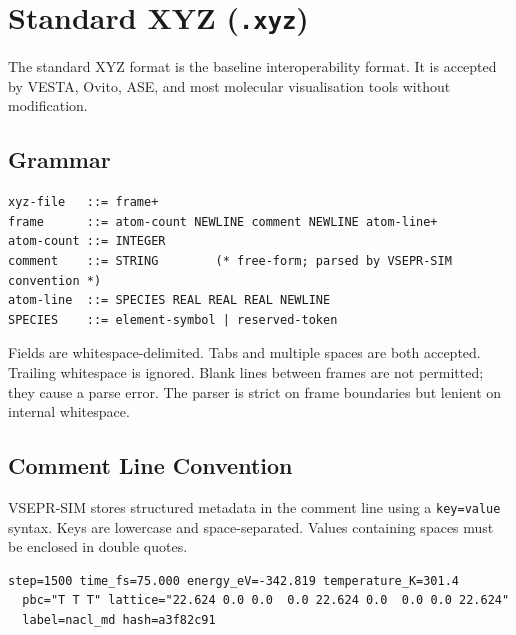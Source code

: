 \documentclass[11pt, a4paper, oneside]{article}
\begin{document}
\section{Standard XYZ (\texttt{.xyz})}
\label{sec:xyz}

The standard XYZ format is the baseline interoperability format. It is
accepted by VESTA, Ovito, ASE, and most molecular visualisation tools
without modification.

\subsection{Grammar}
\label{sec:xyz_grammar}

\begin{lstlisting}[caption={Standard XYZ grammar (EBNF sketch).}]
xyz-file   ::= frame+
frame      ::= atom-count NEWLINE comment NEWLINE atom-line+
atom-count ::= INTEGER
comment    ::= STRING        (* free-form; parsed by VSEPR-SIM convention *)
atom-line  ::= SPECIES REAL REAL REAL NEWLINE
SPECIES    ::= element-symbol | reserved-token
\end{lstlisting}

Fields are whitespace-delimited. Tabs and multiple spaces are both accepted.
Trailing whitespace is ignored. Blank lines between frames are not permitted;
they cause a parse error. The parser is strict on frame boundaries but
lenient on internal whitespace.

\subsection{Comment Line Convention}
\label{sec:xyz_comment}

VSEPR-SIM stores structured metadata in the comment line using a
\texttt{key=value} syntax. Keys are lowercase and space-separated.
Values containing spaces must be enclosed in double quotes.

\begin{lstlisting}[caption={Full comment line example.}]
step=1500 time_fs=75.000 energy_eV=-342.819 temperature_K=301.4
  pbc="T T T" lattice="22.624 0.0 0.0  0.0 22.624 0.0  0.0 0.0 22.624"
  label=nacl_md hash=a3f82c91
\end{lstlisting}
\end{document}
